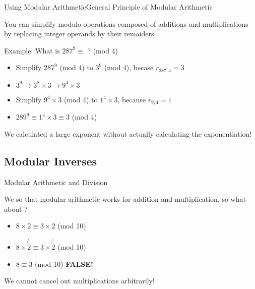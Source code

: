 \begin{frame}{Using Modular Arithmetic}{General Principle of Modular Arithmetic}

  \begin{block}{}
    You can simplify modulo operations composed of additions and multiplications by replacing integer operands by their remaiders.
  \end{block}

  Example: What is $287^9 \equiv$ ? (mod 4)

  \begin{itemize}
    \item Simplify $287^9$ (mod 4) to $3^9$ (mod 4), becase $r_{287,4} = 3$
    \item $3^9 \to 3^8\times 3 \to 9^4 \times 3$
    \item Simplify $9^4 \times 3$ (mod 4) to $1^4 \times 3$, because $r_{9,4} = 1$
    \item $289^9 \equiv 1^4 \times 3 \equiv 3$ (mod 4)
  \end{itemize}\bigskip

  We calculated a large exponent without actually calculating the exponentiation!
\end{frame}


\subsection{Modular Inverses}

\begin{frame}{Modular Arithmetic and Division}

  We so that modular arithmetic works for addition and multiplication, so what about ?\bigskip

  \begin{itemize}
    \item $8\times 2 \equiv 3\times 2$ (mod 10)
    \item $8\times \not{2} \equiv 3\times \not{2}$ (mod 10)
    \item $8 \equiv 3$ (mod 10) \hspace{2cm} \alert{\bf FALSE!}
  \end{itemize}\bigskip

  We cannot cancel out multiplications arbitrarily!
\end{frame}

